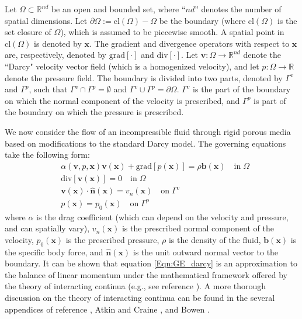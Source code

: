 \documentclass[11pt,reqno]{amsart}
\begin{document}
Let $\Omega \subset \mathbb{R}^{nd}$ be an open and bounded 
set, where ``$nd$'' denotes the number of spatial dimensions. 
Let $\partial \Omega := \mathrm{cl}(\Omega) - \Omega$ be the 
boundary (where $\mathrm{cl}(\Omega)$ is the set closure of 
$\Omega$), which is assumed to be piecewise smooth. A spatial 
point in $\mathrm{cl}(\Omega)$ is denoted by $\mathbf{x}$. 
The gradient and divergence operators with respect to 
$\mathbf{x}$ are, respectively, denoted by $\mathrm{grad}
[\cdot]$ and $\mathrm{div}[\cdot]$. Let $\mathbf{v}:\Omega 
\rightarrow \mathbb{R}^{nd}$ denote the ``Darcy" velocity 
vector field (which is a homogenized velocity), and let 
$p:\Omega \rightarrow \mathbb{R}$ denote the pressure 
field. 
The boundary is divided into two parts, denoted by $\Gamma^{v}$ 
and $\Gamma^{p}$, such that $\Gamma^{v} \cap \Gamma^{p} = \emptyset$ 
and $\Gamma^{v} \cup \Gamma^{p} = \partial \Omega$. $\Gamma^{v}$ 
is the part of the boundary on which the normal component of the 
velocity is prescribed, and $\Gamma^{p}$ is part of the boundary 
on which the pressure is prescribed. 

We now consider the flow of an incompressible fluid 
through rigid porous media based on modifications to 
the standard Darcy model. The governing equations take 
the following form: 
\begin{subequations}
  \label{Eqn:GE}
  \begin{align}
    \label{Eqn:GE_darcy}
    &\alpha(\mathbf{v},p, \mathbf{x}) \mathbf{v}(\mathbf{x}) + 
    \mathrm{grad}[p(\mathbf{x})] = \rho \mathbf{b}(\mathbf{x}) 
    \quad \mathrm{in} \; \Omega \\
\label{Eqn:GE_Continuity}
    &\mathrm{div}[\mathbf{v}(\mathbf{x})] = 0 \quad \mathrm{in} 
    \; \Omega \\
\label{Eqn:GE_Vn}
    &\mathbf{v}(\mathbf{x}) \cdot \mathbf{\hat{n}}(\mathbf{x}) = 
    v_{n}(\mathbf{x}) \quad \mathrm{on} \; \Gamma^{v} \\
\label{Eqn:GE_p0}
    &p(\mathbf{x}) = p_0(\mathbf{x}) \quad \mathrm{on} 
    \; \Gamma^{p}
  \end{align}
\end{subequations}
where $\alpha$ is the drag coefficient (which can depend 
on the velocity and pressure, and can spatially vary), 
$v_n(\mathbf{x})$ is the prescribed normal component of 
the velocity, $p_0(\mathbf{x})$ is the prescribed pressure, 
$\rho$ is the density of the fluid, $\mathbf{b}(\mathbf{x})$ 
is the specific body force, and $\mathbf{\hat{n}}(\mathbf{x})$ 
is the unit outward normal vector to the boundary. 
It can be shown that equation \eqref{Eqn:GE_darcy} is an 
approximation to the balance of linear momentum under the 
mathematical framework offered by the theory of interacting 
continua (e.g., see reference \cite[Introduction]
{Nakshatrala_Rajagopal_IJNMF_2011_v67_p342}). 
A more thorough discussion on the theory of interacting 
continua can be found in the several appendices of 
reference \cite{Truesdell_rational_thermodynamics}, 
Atkin and Craine \cite{Atkin_Craine_QJMAM_1976_v29_p209}, 
and Bowen \cite{Bowen}. 
\end{document}
